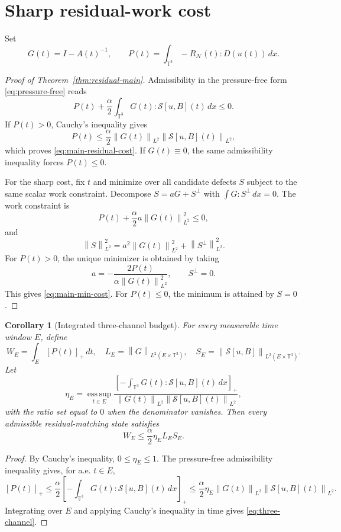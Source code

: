 \documentclass[10pt,a4paper]{amsart}
\numberwithin{equation}{section}
\newtheorem{corollary}[theorem]{Corollary}
\newcommand{\T}{\mathbb T}
\newcommand{\Id}{I}
\newcommand{\calN}{\mathcal N}
\newcommand{\calS}{\mathcal S}
\newcommand{\norm}[1]{\left\lVert #1\right\rVert}
\begin{document}
\section{Sharp residual-work cost}

Set
\[
  G(t)=\Id-A(t)^{-1},\qquad
  P(t)=\int_{\T^3}-R_{\calN}(t):D(u(t))\,dx .
\]


\begin{proof}[Proof of Theorem~\ref{thm:residual-main}]
Admissibility in the pressure-free form \eqref{eq:pressure-free} reads
\[
  P(t)+\frac{\alpha}{2}\int_{\T^3}G(t):\calS[u,B](t)\,dx\le0 .
\]
If \(P(t)>0\), Cauchy's inequality gives
\[
  P(t)\le
  \frac{\alpha}{2}\norm{G(t)}_{L^2}\norm{\calS[u,B](t)}_{L^2},
\]
which proves \eqref{eq:main-residual-cost}.  If \(G(t)\equiv0\), the same
admissibility inequality forces \(P(t)\le0\).

For the sharp cost, fix \(t\) and minimize over all candidate defects \(S\)
subject to the same scalar work constraint.  Decompose \(S=aG+S^\perp\) with
\(\int G:S^\perp\,dx=0\).  The work constraint is
\[
  P(t)+\frac{\alpha}{2}a\norm{G(t)}_{L^2}^2\le0,
\]
and
\[
  \norm{S}_{L^2}^2=a^2\norm{G(t)}_{L^2}^2+\norm{S^\perp}_{L^2}^2.
\]
For \(P(t)>0\), the unique minimizer is obtained by taking
\[
  a=-\frac{2P(t)}{\alpha\norm{G(t)}_{L^2}^2},
  \qquad S^\perp=0.
\]
This gives \eqref{eq:main-min-cost}.  For \(P(t)\le0\), the minimum is
attained by \(S=0\).
\end{proof}


\begin{corollary}[Integrated three-channel budget]
\label{cor:three-channel}
For every measurable time window \(E\), define
\[
  W_E=\int_E[P(t)]_+\,dt,\quad
  L_E=\norm{G}_{L^2(E\times\T^3)},\quad
  S_E=\norm{\calS[u,B]}_{L^2(E\times\T^3)}.
\]
Let
\[
  \eta_E=
  \operatorname*{ess\,sup}_{t\in E}
  \frac{\left[-\int_{\T^3}G(t):\calS[u,B](t)\,dx\right]_+}
       {\norm{G(t)}_{L^2}\norm{\calS[u,B](t)}_{L^2}},
\]
with the ratio set equal to \(0\) when the denominator vanishes.  Then every
admissible residual-matching state satisfies
\begin{equation}
  W_E\le \frac{\alpha}{2}\eta_E L_ES_E .
  \label{eq:three-channel}
\end{equation}
\end{corollary}

\begin{proof}
By Cauchy's inequality, \(0\le\eta_E\le1\).  The pressure-free
admissibility inequality gives, for a.e. \(t\in E\),
\[
  [P(t)]_+
  \le
  \frac{\alpha}{2}
  \left[-\int_{\T^3}G(t):\calS[u,B](t)\,dx\right]_+
  \le
  \frac{\alpha}{2}\eta_E
  \norm{G(t)}_{L^2}\norm{\calS[u,B](t)}_{L^2}.
\]
Integrating over \(E\) and applying Cauchy's inequality in time gives
\eqref{eq:three-channel}.
\end{proof}
\end{document}
